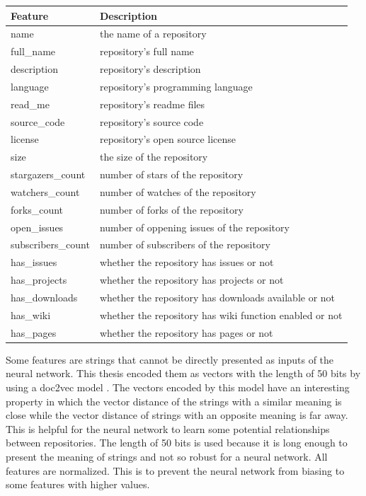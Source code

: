 \documentclass[11pt,twoside]{report}
\begin{document}
\begin{center}
    \begin{tabular}{l | l}
    \hline
    Feature & Description \\
    \hline
    name & the name of a repository \\
    full\_name & repository's full name \\
    description & repository's description \\
    language & repository's programming language \\
    read\_me & repository's readme files \\
    source\_code & repository's source code \\
    license & repository's open source license \\
    size & the size of the repository \\
    stargazers\_count & number of stars of the repository \\
    watchers\_count & number of watches of the repository \\
    forks\_count & number of forks of the repository \\
    open\_issues & number of oppening issues of the repository \\
    subscribers\_count & number of subscribers of the repository \\
    has\_issues & whether the repository has issues or not \\
    has\_projects & whether the repository has projects or not \\
    has\_downloads & whether the repository has downloads available or not \\
    has\_wiki & whether the repository has wiki function enabled or not \\
    has\_pages & whether the repository has pages or not \\
    \end{tabular}
    \label{tab:repo_features}
\end{center}

Some features are strings that cannot be directly presented as inputs of the neural network. This thesis encoded them as vectors with the length of 50 bits by using a doc2vec model \cite{rehurek_lrec}. The vectors encoded by this model have an interesting property in which the vector distance of the strings with a similar meaning is close while the vector distance of strings with an opposite meaning is far away. This is helpful for the neural network to learn some potential relationships between repositories. The length of 50 bits is used because it is long enough to present the meaning of strings and not so robust for a neural network. All features are normalized. This is to prevent the neural network from biasing to some features with higher values.
\end{document}
